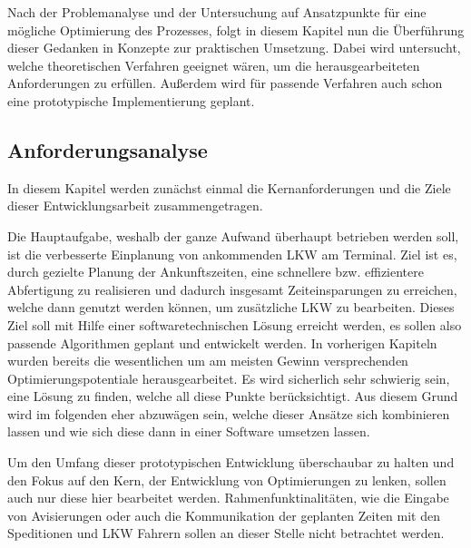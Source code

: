 Nach der Problemanalyse und der Untersuchung auf Ansatzpunkte für eine mögliche Optimierung des Prozesses, folgt in diesem Kapitel nun die Überführung dieser Gedanken in Konzepte zur praktischen Umsetzung. Dabei wird untersucht, welche theoretischen Verfahren geeignet wären, um die herausgearbeiteten Anforderungen zu erfüllen. Außerdem wird für passende Verfahren auch schon eine prototypische Implementierung geplant.

\subsection{Anforderungsanalyse}


In diesem Kapitel werden zunächst einmal die Kernanforderungen und die Ziele dieser Entwicklungsarbeit zusammengetragen.

Die Hauptaufgabe, weshalb der ganze Aufwand überhaupt betrieben werden soll, ist die verbesserte Einplanung von ankommenden LKW am Terminal. Ziel ist es, durch gezielte Planung der Ankunftszeiten, eine schnellere bzw. effizientere Abfertigung zu realisieren und dadurch insgesamt Zeiteinsparungen zu erreichen, welche dann genutzt werden können, um zusätzliche LKW zu bearbeiten. Dieses Ziel soll mit Hilfe einer softwaretechnischen Lösung erreicht werden, es sollen also passende Algorithmen geplant und entwickelt werden. In vorherigen Kapiteln wurden bereits die wesentlichen um am meisten Gewinn versprechenden Optimierungspotentiale herausgearbeitet. Es wird sicherlich sehr schwierig sein, eine Lösung zu finden, welche all diese Punkte berücksichtigt. Aus diesem Grund wird im folgenden eher abzuwägen sein, welche dieser Ansätze sich kombinieren lassen und wie sich diese dann in einer Software umsetzen lassen.

Um den Umfang dieser prototypischen Entwicklung überschaubar zu halten und den Fokus auf den Kern, der Entwicklung von Optimierungen zu lenken, sollen auch nur diese hier bearbeitet werden. Rahmenfunktinalitäten, wie die Eingabe von Avisierungen oder auch die Kommunikation der geplanten Zeiten mit den Speditionen und LKW Fahrern sollen an dieser Stelle nicht betrachtet werden.

